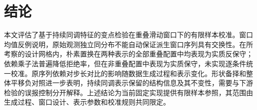 \section{结论}\label{sec:conclusion}

本文评估了基于持续同调特征的变点检验在重叠滑动窗口下的有限样本校准。窗口均值反例说明，原始观测独立同分布不能自动保证派生窗口序列具有交换性。在所考察的设计网格内，朴素置换在两种表示的全部重叠配置中均表现为实质反保守；依赖乘子法普遍降低拒绝率，但在非重叠配置中表现为实质保守，未实现逐条件统一校准。原序列依赖对步长对比的影响随数据生成过程和表示变化。形状备择和整体平移负对照进一步表明，持续同调表示保留的结构信息及其不变性，需要与下游检验的误报控制分开解释。上述结论为当前固定实现提供有限样本参照，其范围由生成过程、窗口设计、表示参数和校准规则共同限定。
